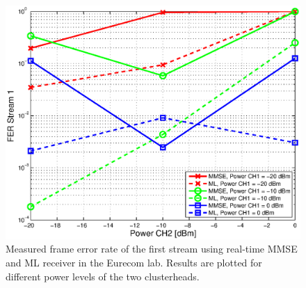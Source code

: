 \documentclass[a4paper,twocolumn,journal]{IEEEtran}
\begin{document}
% 
% 

\begin{figure}
 \includegraphics[width=\columnwidth]{figures/emos_results_ML+MMSE}
 \caption{Measured frame error rate of the first stream using real-time MMSE and ML receiver in the Eurecom lab. Results are plotted for different power levels of the two clusterheads.}
\label{fig:emos_results}
\end{figure}
\end{document}
